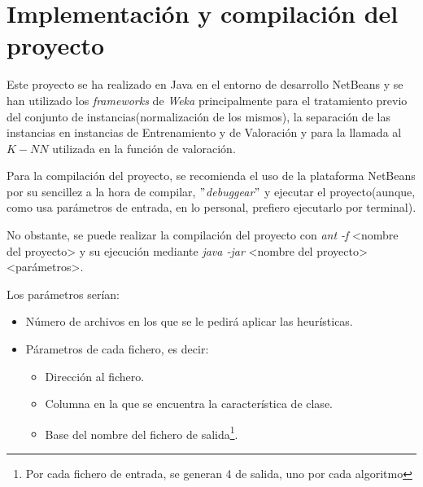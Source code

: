 \section{Implementación y compilación del proyecto}
	Este proyecto se ha realizado en Java en el entorno de desarrollo NetBeans y se han utilizado
	los \textit{frameworks} de \textit{Weka} principalmente para el tratamiento previo del
	conjunto de instancias(normalización de los mismos), la separación de las instancias en
	instancias de Entrenamiento y de Valoración y para la llamada al $K-NN$ utilizada en la
	función de valoración.
	
	Para la compilación del proyecto, se recomienda el uso de la plataforma NetBeans por su
	sencillez a la hora de compilar, \textit{$"$debuggear$"$} y ejecutar el proyecto(aunque,
	como usa parámetros de entrada, en lo personal, prefiero ejecutarlo por terminal).
	
	No obstante, se puede realizar la compilación del proyecto con \textit{ant -f} <nombre del
	proyecto> y su ejecución mediante \textit{java -jar} <nombre del proyecto> <parámetros>.
	
	Los parámetros serían:
		\begin{itemize}
			\item Número de archivos en los que se le pedirá aplicar las heurísticas.
			\item Párametros de cada fichero, es decir:
				\begin{itemize}
					\item Dirección al fichero.
					\item Columna en la que se encuentra la característica de clase.
					\item Base del nombre del fichero de salida\footnote{Por cada fichero
					de entrada, se generan 4 de salida, uno por cada algoritmo}.
				\end{itemize}
		\end{itemize}
